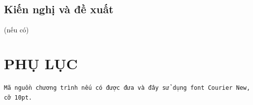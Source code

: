 \documentclass{article}%
\begin{document}
\subsection*{Kiến nghị và đề xuất}
(nếu có)

\cleardoublepage





\cleardoublepage
\section*{PHỤ LỤC}
\texttt{\fontsize{10pt}{0pt}\selectfont Mã nguồn chương trình nếu có được đưa và đây sử dụng font 
Courier New, cỡ 10pt.}
\end{document}

